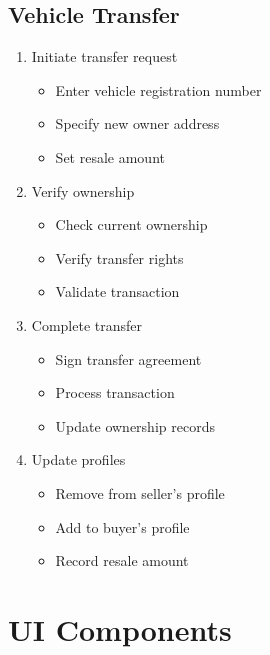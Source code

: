 \documentclass[12pt,a4paper]{article}
\begin{document}
    \subsection{Vehicle Transfer}
    \begin{enumerate}
        \item Initiate transfer request
        \begin{itemize}
            \item Enter vehicle registration number
            \item Specify new owner address
            \item Set resale amount
        \end{itemize}

        \item Verify ownership
        \begin{itemize}
            \item Check current ownership
            \item Verify transfer rights
            \item Validate transaction
        \end{itemize}

        \item Complete transfer
        \begin{itemize}
            \item Sign transfer agreement
            \item Process transaction
            \item Update ownership records
        \end{itemize}

        \item Update profiles
        \begin{itemize}
            \item Remove from seller's profile
            \item Add to buyer's profile
            \item Record resale amount
        \end{itemize}
    \end{enumerate}


    \section{UI Components}
\end{document}
